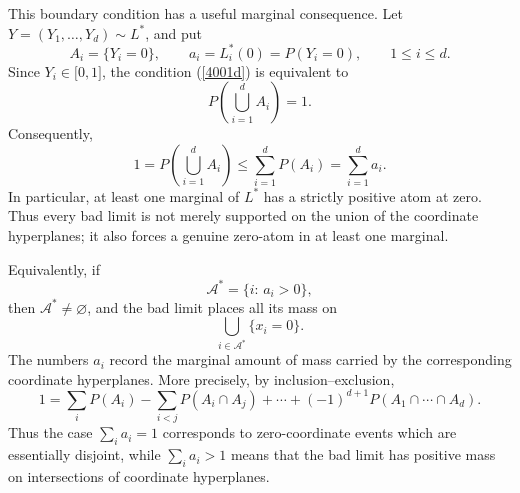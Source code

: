 \documentclass[onecolumn]{article}
\begin{document}
This boundary condition has a useful marginal consequence. Let $%
Y=(Y_{1},\ldots ,Y_{d})\sim L^{\ast }$, and put 
\begin{equation}
A_{i}=\{Y_{i}=0\},\qquad a_{i}=L_{i}^{\ast }(0)=P(Y_{i}=0),\qquad 1\leq
i\leq d.  \label{4001e}
\end{equation}%
Since $Y_{i}\in \lbrack 0,1]$, the condition (\ref{4001d}) is equivalent to 
\begin{equation}
P\left( \bigcup_{i=1}^{d}A_{i}\right) =1.  \label{4001f}
\end{equation}%
Consequently, 
\begin{equation}
1=P\left( \bigcup_{i=1}^{d}A_{i}\right) \leq
\sum_{i=1}^{d}P(A_{i})=\sum_{i=1}^{d}a_{i}.  \label{4001g}
\end{equation}%
In particular, at least one marginal of $L^{\ast }$ has a strictly positive
atom at zero. Thus every bad limit is not merely supported on the union of
the coordinate hyperplanes; it also forces a genuine zero-atom in at least
one marginal.

Equivalently, if 
\begin{equation}
\mathcal{A}^{\ast }=\{i:\,a_{i}>0\},  \label{4001h}
\end{equation}%
then $\mathcal{A}^{\ast }\neq \varnothing $, and the bad limit places all
its mass on 
\begin{equation}
\bigcup_{i\in \mathcal{A}^{\ast }}\{x_{i}=0\}.  \label{4001j}
\end{equation}%
The numbers $a_{i}$ record the marginal amount of mass carried by the
corresponding coordinate hyperplanes. More precisely, by
inclusion--exclusion, 
\begin{equation}
1=\sum_{i}P(A_{i})-\sum_{i<j}P(A_{i}\cap A_{j})+\cdots
+(-1)^{d+1}P(A_{1}\cap \cdots \cap A_{d}).  \label{4001k}
\end{equation}%
Thus the case $\sum_{i}a_{i}=1$ corresponds to zero-coordinate events which
are essentially disjoint, while $\sum_{i}a_{i}>1$ means that the bad limit
has positive mass on intersections of coordinate hyperplanes.
\end{document}
